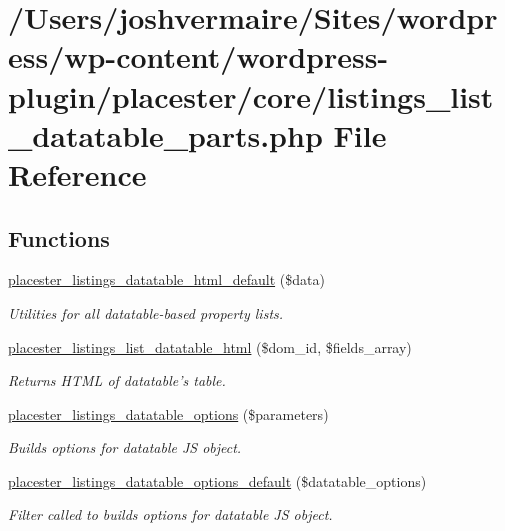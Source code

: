 \hypertarget{listings__list__datatable__parts_8php}{
\section{/Users/joshvermaire/Sites/wordpress/wp-\/content/wordpress-\/plugin/placester/core/listings\_\-list\_\-datatable\_\-parts.php File Reference}
\label{d0/d4b/listings__list__datatable__parts_8php}
}
\subsection*{Functions}
\begin{DoxyCompactItemize}
\item 
\hyperlink{listings__list__datatable__parts_8php_a179527dacbca367c8c09f069af3f5973}{placester\_\-listings\_\-datatable\_\-html\_\-default} (\$data)
\begin{DoxyCompactList}\small\item\em Utilities for all datatable-\/based property lists. \end{DoxyCompactList}\item 
\hyperlink{listings__list__datatable__parts_8php_ac7bc2286ce0a70c4fa499afbf978738c}{placester\_\-listings\_\-list\_\-datatable\_\-html} (\$dom\_\-id, \$fields\_\-array)
\begin{DoxyCompactList}\small\item\em Returns HTML of datatable's table. \end{DoxyCompactList}\item 
\hyperlink{listings__list__datatable__parts_8php_ad09c6f840445684cac3190d03dcb5519}{placester\_\-listings\_\-datatable\_\-options} (\$parameters)
\begin{DoxyCompactList}\small\item\em Builds options for datatable JS object. \end{DoxyCompactList}\item 
\hyperlink{listings__list__datatable__parts_8php_abdc9e9b1d821f3630891955c7c8dea95}{placester\_\-listings\_\-datatable\_\-options\_\-default} (\$datatable\_\-options)
\begin{DoxyCompactList}\small\item\em Filter called to builds options for datatable JS object. \end{DoxyCompactList}\item 

\end{DoxyCompactItemize}
